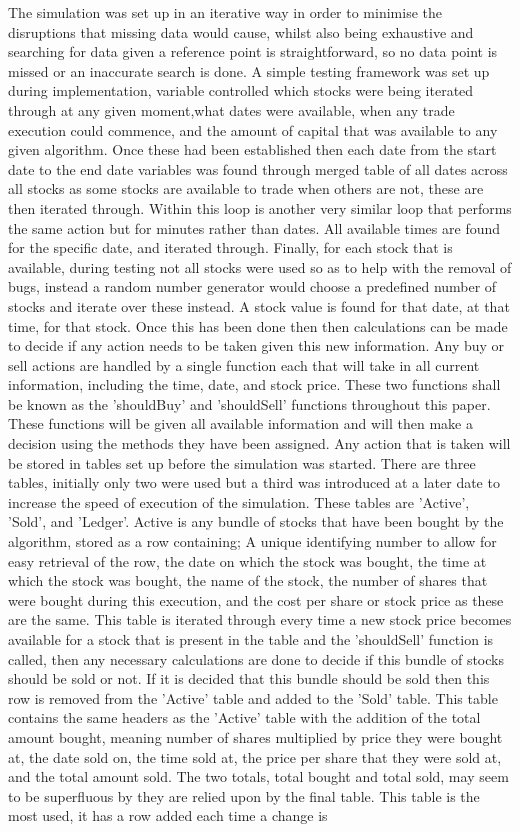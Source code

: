 \documentclass[12pt,a4paper]{article}
\begin{document}
\iffalse
The simulation was set up in an iterative way in order to minimise the disruptions that missing data would cause, whilst also being exhaustive and searching for data given a reference point is straightforward, so no data point is missed or an inaccurate search is done. A simple testing framework was set up during implementation, variable controlled which stocks were being iterated through at any given moment,what dates were available, when any trade execution could commence, and the amount of capital that was available to any given algorithm. Once these had been established then each date from the start date to the end date variables was found through merged table of all dates across all stocks as some stocks are available to trade when others are not, these are then iterated through. Within this loop is another very similar loop that performs the same action but for minutes rather than dates. All available times are found for the specific date, and iterated through. Finally, for each stock that is available, during testing not all stocks were used so as to help with the removal of bugs, instead a random number generator would choose a predefined number of stocks and iterate over these instead. A stock value is found for that date, at that time, for that stock. Once this has been done then then calculations can be made to decide if any action needs to be taken given this new information. Any buy or sell actions are handled by a single function each that will take in all current information, including the time, date, and stock price. These two functions shall be known as the 'shouldBuy' and 'shouldSell' functions throughout this paper. These functions will be given all available information and will then make a decision using the methods they have been assigned. Any action that is taken will be stored in tables set up before the simulation was started. There are three tables, initially only two were used but a third was introduced at a later date to increase the speed of execution of the simulation. These tables are 'Active', 'Sold', and 'Ledger'. Active is any bundle of stocks that have been bought by the algorithm, stored as a row containing; A unique identifying number to allow for easy retrieval of the row, the date on which the stock was bought, the time at which the stock was bought, the name of the stock, the number of shares that were bought during this execution, and the cost per share or stock price as these are the same. This table is iterated through every time a new stock price becomes available for a stock that is present in the table and the 'shouldSell' function is called, then any necessary calculations are done to decide if this bundle of stocks should be sold or not. If it is decided that this bundle should be sold then this row is removed from the 'Active' table and added to the 'Sold' table. This table contains the same headers as the 'Active' table with the addition of the total amount bought, meaning number of shares multiplied by price they were bought at, the date sold on, the time sold at, the price per share that they were sold at, and the total amount sold. The two totals, total bought and total sold, may seem to be superfluous by they are relied upon by the final table. This table is the most used, it has a row added each time a change is 
\end{document}

